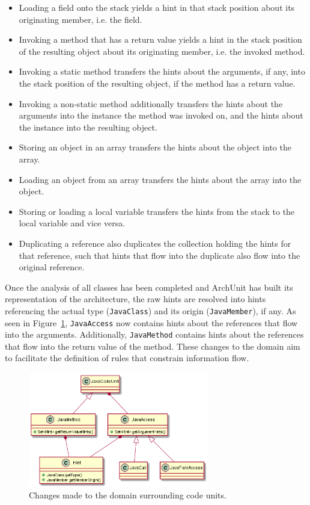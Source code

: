 \begin{itemize}
    \item Loading a field onto the stack yields a hint in that stack position about its originating member, i.e. the field.
    \item Invoking a method that has a return value yields a hint in the stack position of the resulting object about its originating member, i.e. the invoked method.
    \item Invoking a static method transfers the hints about the arguments, if any, into the stack position of the resulting object, if the method has a return value.
    \item Invoking a non-static method additionally transfers the hints about the arguments into the instance the method was invoked on, and the hints about the instance into the resulting object.
    \item Storing an object in an array transfers the hints about the object into the array.
    \item Loading an object from an array transfers the hints about the array into the object.
    \item Storing or loading a local variable transfers the hints from the stack to the local variable and vice versa.
    \item Duplicating a reference also duplicates the collection holding the hints for that reference, such that hints that flow into the duplicate also flow into the original reference.
\end{itemize}

Once the analysis of all classes has been completed and ArchUnit has built its representation of the architecture, the raw hints are resolved into hints referencing the actual type (\texttt{JavaClass}) and its origin (\texttt{JavaMember}), if any. As seen in Figure~\ref{fig:domain_changes_1}, \texttt{JavaAccess} now contains hints about the references that flow into the arguments. Additionally, \texttt{JavaMethod} contains hints about the references that flow into the return value of the method. These changes to the domain aim to facilitate the definition of rules that constrain information flow.

\begin{figure}
    \centering
    \includegraphics[width=0.7\textwidth]{figure/extension/DomainChanges1.png}
    \caption{Changes made to the domain surrounding code units.}
    \label{fig:domain_changes_1}
\end{figure}

